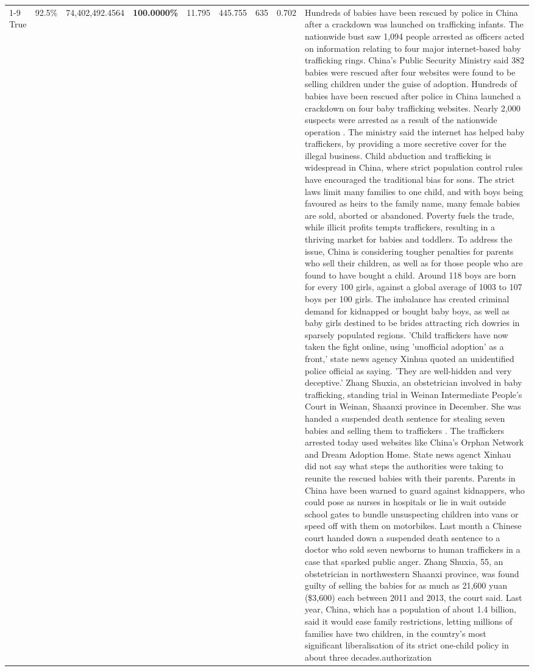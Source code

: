 \begin{table}[H]
\begin{tabular}{lllrlllll}
\cline{1-9}
True & 92.5\% & 74,402,492.4564 & \bfseries \color{red} 100.0000\% & 11.795 & 445.755 & 635 & 0.702 & Hundreds of babies have been rescued by police in China after a crackdown was launched on trafficking infants. The nationwide bust saw 1,094 people arrested as officers acted on information relating to four major internet-based baby trafficking rings. China's Public Security Ministry said 382 babies were rescued after four websites were found to be selling children under the guise of adoption. Hundreds of babies have been rescued after police in China launched a crackdown on four baby trafficking websites. Nearly 2,000 suspects were arrested as a result of the nationwide operation . The ministry said the internet has helped baby traffickers, by providing a more secretive cover for the illegal business. Child abduction and trafficking is widespread in China, where strict population control rules have encouraged the traditional bias for sons. The strict laws limit many families to one child, and with boys being favoured as heirs to the family name, many female babies are sold, aborted or abandoned. Poverty fuels the trade, while illicit profits tempts traffickers, resulting in a thriving market for babies and toddlers. To address the issue, China is considering tougher penalties for parents who sell their children, as well as for those people who are found to have bought a child. Around 118 boys are born for every 100 girls, against a global average of 1003 to 107 boys per 100 girls. The imbalance has created criminal demand for kidnapped or bought baby boys, as well as baby girls destined to be brides attracting rich dowries in sparsely populated regions. 'Child traffickers have now taken the fight online, using 'unofficial adoption' as a front,' state news agency Xinhua quoted an unidentified police official as saying. 'They are well-hidden and very deceptive.' Zhang Shuxia, an obstetrician involved in baby trafficking, standing trial in Weinan Intermediate People's Court in Weinan, Shaanxi province in December. She was handed a suspended death sentence for stealing seven babies and selling them to traffickers . The traffickers arrested today used websites like China's Orphan Network and Dream Adoption Home. State news agenct Xinhau did not say what steps the authorities were taking to reunite the rescued babies with their parents. Parents in China have been warned to guard against kidnappers, who could pose as nurses in hospitals or lie in wait outside school gates to bundle unsuspecting children into vans or speed off with them on motorbikes. Last month a Chinese court handed down a suspended death sentence to a doctor who sold seven newborns to human traffickers in a case that sparked public anger. Zhang Shuxia, 55, an obstetrician in northwestern Shaanxi province, was found guilty of selling the babies for as much as 21,600 yuan (\$3,600) each between 2011 and 2013, the court said. Last year, China, which has a population of about 1.4 billion, said it would ease family restrictions, letting millions of families have two children, in the country's most significant liberalisation of its strict one-child policy in about three decades.authorization \\

\end{tabular}
\end{table}
